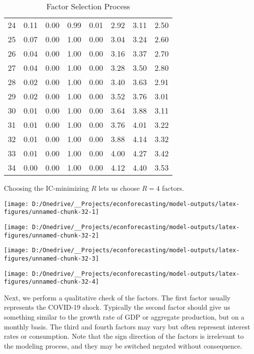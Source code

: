 \documentclass[11pt, letterpaper]{article}\usepackage[]{graphicx}\usepackage[]{color}
\begin{document}
\begin{table}[H]
\begin{tabular}{cccccccc}
   24 & 0.11 & 0.00 & 0.99 & 0.01 & 2.92 & 3.11 & 2.50 \\ 
   25 & 0.07 & 0.00 & 1.00 & 0.00 & 3.04 & 3.24 & 2.60 \\ 
   26 & 0.04 & 0.00 & 1.00 & 0.00 & 3.16 & 3.37 & 2.70 \\ 
   27 & 0.04 & 0.00 & 1.00 & 0.00 & 3.28 & 3.50 & 2.80 \\ 
   28 & 0.02 & 0.00 & 1.00 & 0.00 & 3.40 & 3.63 & 2.91 \\ 
   29 & 0.02 & 0.00 & 1.00 & 0.00 & 3.52 & 3.76 & 3.01 \\ 
   30 & 0.01 & 0.00 & 1.00 & 0.00 & 3.64 & 3.88 & 3.11 \\ 
   31 & 0.01 & 0.00 & 1.00 & 0.00 & 3.76 & 4.01 & 3.22 \\ 
   32 & 0.01 & 0.00 & 1.00 & 0.00 & 3.88 & 4.14 & 3.32 \\ 
   33 & 0.01 & 0.00 & 1.00 & 0.00 & 4.00 & 4.27 & 3.42 \\ 
   34 & 0.00 & 0.00 & 1.00 & 0.00 & 4.12 & 4.40 & 3.53 \\ 
   \hline
\end{tabular}
\endgroup
\caption{Factor Selection Process} 
\end{table}


Choosing the IC-minimizing $R$ lets us choose $R = 4$ factors.



{\centering \texttt{[image: D:/Onedrive/\_\_Projects/econforecasting/model-outputs/latex-figures/unnamed-chunk-32-1]} 

}




{\centering \texttt{[image: D:/Onedrive/\_\_Projects/econforecasting/model-outputs/latex-figures/unnamed-chunk-32-2]} 

}




{\centering \texttt{[image: D:/Onedrive/\_\_Projects/econforecasting/model-outputs/latex-figures/unnamed-chunk-32-3]} 

}




{\centering \texttt{[image: D:/Onedrive/\_\_Projects/econforecasting/model-outputs/latex-figures/unnamed-chunk-32-4]} 

}




Next, we perform a qualitative check of the factors. The first factor usually represents the COVID-19 shock. Typically the second factor should give us something similar to the growth rate of GDP or aggregate production, but on a monthly basis. The third and fourth factors may vary but often represent interest rates or consumption. Note that the sign direction of the factors is irrelevant to the modeling process, and they may be switched negated without consequence. 
\end{document}
